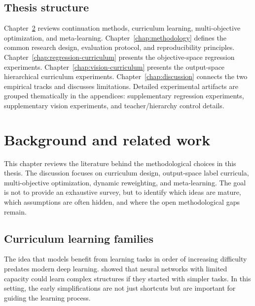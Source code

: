 \documentclass[english,master,a4paper,oneside]{ppfcmthesis}
\begin{document}
\section{Thesis structure}

Chapter~\ref{chap:literature-review} reviews continuation methods, curriculum
learning, multi-objective optimization, and meta-learning. Chapter~\ref{chap:methodology}
defines the common research design, evaluation protocol, and reproducibility
principles. Chapter~\ref{chap:regression-curriculum} presents the
objective-space regression experiments. Chapter~\ref{chap:vision-curriculum}
presents the output-space hierarchical curriculum experiments. Chapter~\ref{chap:discussion}
connects the two empirical tracks and discusses limitations. Detailed
experimental artifacts are grouped thematically in the appendices: supplementary
regression experiments, supplementary vision experiments, and teacher/hierarchy
control details.

\chapter{Background and related work}
\label{chap:literature-review}

This chapter reviews the literature behind the methodological choices in this
thesis. The discussion focuses on curriculum design, output-space label
curricula, multi-objective optimization, dynamic reweighting, and meta-learning.
The goal is not to provide an exhaustive survey, but to identify which ideas are
mature, which assumptions are often hidden, and where the open methodological
gaps remain.

\section{Curriculum learning families}
\label{sec:curriculum-continuation}

The idea that models benefit from learning tasks in order of increasing
difficulty predates modern deep learning. \citet{elman1993learning} showed
that neural networks with limited capacity could learn complex structures if
they started with simpler tasks. In this setting, the early simplifications are
not just shortcuts but are important for guiding the learning process.
\end{document}
